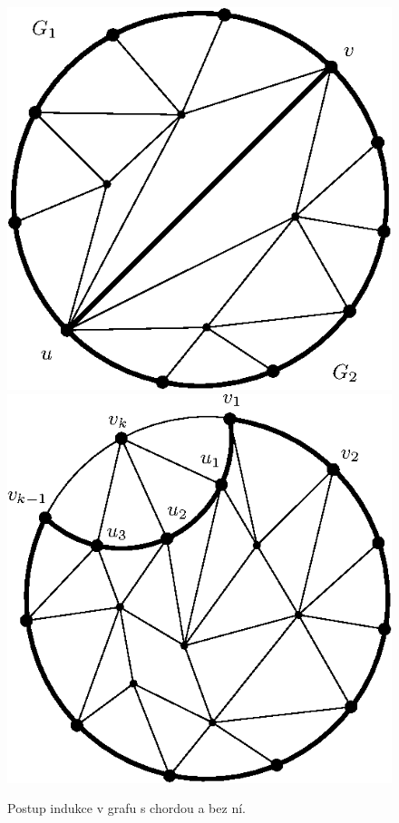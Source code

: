 \noindent
\begin{figure}[h!]
	\centering
	\includegraphics{thomassen-chord.eps}
	\includegraphics{thomassen-induction.eps}
	\caption{Postup indukce v grafu s chordou a bez ní.}
\end{figure}

